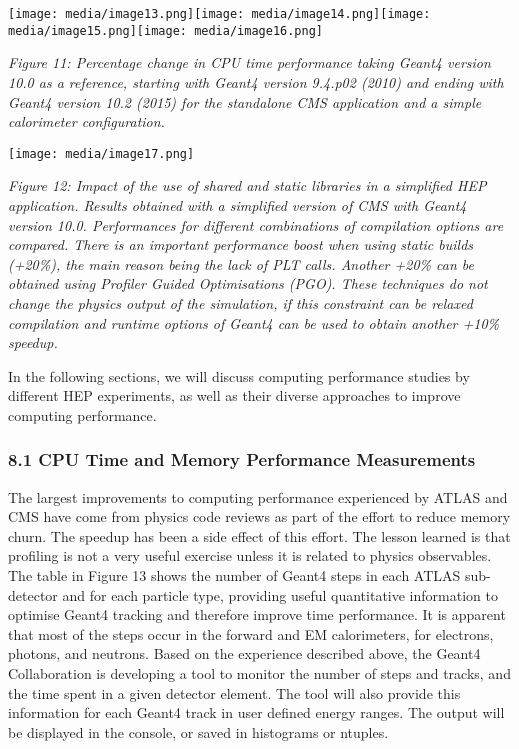 \documentclass[12pt,a4paper]{article}
\begin{document}
\texttt{[image: media/image13.png]}\texttt{[image: media/image14.png]}\texttt{[image: media/image15.png]}\texttt{[image: media/image16.png]}

\emph{Figure 11: Percentage change in CPU time performance taking Geant4
version 10.0 as a reference, starting with Geant4 version 9.4.p02 (2010)
and ending with Geant4 version 10.2 (2015) for the standalone CMS
application and a simple calorimeter configuration.}

\texttt{[image: media/image17.png]}

\emph{Figure 12: Impact of the use of shared and static libraries in a
simplified HEP application. Results obtained with a simplified version
of CMS with Geant4 version 10.0. Performances for different combinations
of compilation options are compared. There is an important performance
boost when using static builds (+20\%), the main reason being the lack
of PLT calls. Another +20\% can be obtained using Profiler Guided
Optimisations (PGO). These techniques do not change the physics output
of the simulation, if this constraint can be relaxed compilation and
runtime options of Geant4 can be used to obtain another +10\% speedup. }

In the following sections, we will discuss computing performance studies
by different HEP experiments, as well as their diverse approaches to
improve computing performance.

\hypertarget{cpu-time-and-memory-performance-measurements}{%
\subsubsection{8.1 CPU Time and Memory Performance
Measurements}\label{cpu-time-and-memory-performance-measurements}}

The largest improvements to computing performance experienced by ATLAS
and CMS have come from physics code reviews as part of the effort to
reduce memory churn. The speedup has been a side effect of this effort.
The lesson learned is that profiling is not a very useful exercise
unless it is related to physics observables. The table in Figure 13
shows the number of Geant4 steps in each ATLAS sub-detector and for each
particle type, providing useful quantitative information to optimise
Geant4 tracking and therefore improve time performance. It is apparent
that most of the steps occur in the forward and EM calorimeters, for
electrons, photons, and neutrons. Based on the experience described
above, the Geant4 Collaboration is developing a tool to monitor the
number of steps and tracks, and the time spent in a given detector
element. The tool will also provide this information for each Geant4
track in user defined energy ranges. The output will be displayed in the
console, or saved in histograms or ntuples.
\end{document}
